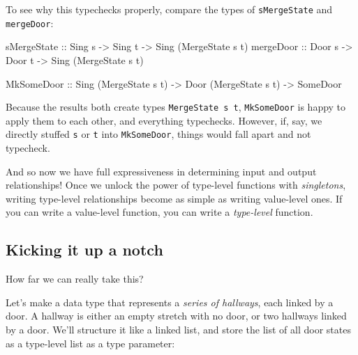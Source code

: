 \documentclass[]{article}
\newenvironment{Shaded}{}{}
\newcommand{\DataTypeTok}[1]{\textcolor[rgb]{0.56,0.13,0.00}{#1}}
\newcommand{\NormalTok}[1]{#1}
\newcommand{\OtherTok}[1]{\textcolor[rgb]{0.00,0.44,0.13}{#1}}
\begin{document}
To see why this typechecks properly, compare the types of \texttt{sMergeState}
and \texttt{mergeDoor}:

\begin{Shaded}
\begin{Highlighting}[]
\OtherTok{sMergeState ::} \DataTypeTok{Sing}\NormalTok{ s }\OtherTok{{-}>} \DataTypeTok{Sing}\NormalTok{ t }\OtherTok{{-}>} \DataTypeTok{Sing}\NormalTok{ (}\DataTypeTok{MergeState}\NormalTok{ s t)}
\OtherTok{mergeDoor   ::} \DataTypeTok{Door}\NormalTok{ s }\OtherTok{{-}>} \DataTypeTok{Door}\NormalTok{ t }\OtherTok{{-}>} \DataTypeTok{Sing}\NormalTok{ (}\DataTypeTok{MergeState}\NormalTok{ s t)}

\DataTypeTok{MkSomeDoor}\OtherTok{  ::} \DataTypeTok{Sing}\NormalTok{ (}\DataTypeTok{MergeState}\NormalTok{ s t) }\OtherTok{{-}>} \DataTypeTok{Door}\NormalTok{ (}\DataTypeTok{MergeState}\NormalTok{ s t) }\OtherTok{{-}>} \DataTypeTok{SomeDoor}
\end{Highlighting}
\end{Shaded}

Because the results both create types \texttt{MergeState\ s\ t},
\texttt{MkSomeDoor} is happy to apply them to each other, and everything
typechecks. However, if, say, we directly stuffed \texttt{s} or \texttt{t} into
\texttt{MkSomeDoor}, things would fall apart and not typecheck.

And so now we have full expressiveness in determining input and output
relationships! Once we unlock the power of type-level functions with
\emph{singletons}, writing type-level relationships become as simple as writing
value-level ones. If you can write a value-level function, you can write a
\emph{type-level} function.

\hypertarget{kicking-it-up-a-notch}{%
\subsection{Kicking it up a notch}\label{kicking-it-up-a-notch}}

How far we can really take this?

Let's make a data type that represents a \emph{series of hallways}, each linked
by a door. A hallway is either an empty stretch with no door, or two hallways
linked by a door. We'll structure it like a linked list, and store the list of
all door states as a type-level list as a type parameter:
\end{document}
